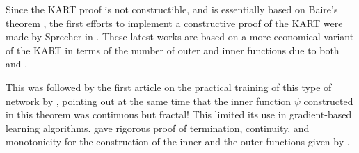 \documentclass{article} %
\theoremstyle{plain}
\theoremstyle{definition}
\theoremstyle{remark}
\begin{document}
Since the KART proof is not constructible, and is essentially based on Baire's theorem \cite{kahane1975theoreme}, the first efforts to implement a constructive proof of the KART were made by Sprecher in \cite{sprecher1996numerical, sprecher1997numerical}. These latest works are based on a more economical variant of the KART in terms of the number of outer and inner functions due to both  \citet{sprecher1965structure} and \citet{lorentz1966approximation}. %

This was followed by the first article on the practical training of this type of network by \citet{koppen2002training}, pointing out at the same time that the inner function $\psi$ constructed in this theorem was continuous but fractal! This limited its use in gradient-based learning algorithms. \citet{braun2009constructive} gave rigorous proof of termination, continuity, and monotonicity for the construction of the inner and the outer functions given by \citet{sprecher1997numerical}.


\end{document}
